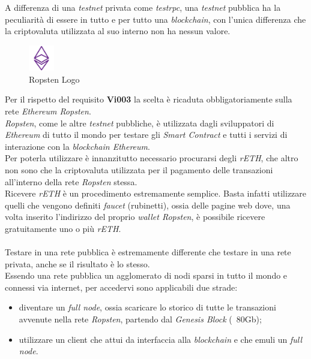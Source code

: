 \documentclass[11pt]{thesistemp}
\begin{document}
A differenza di una \textit{testnet} privata come \textit{testrpc}, una \textit{testnet} pubblica ha la peculiarità di essere in tutto e per tutto una \textit{blockchain}, con l'unica differenza che la criptovaluta utilizzata al suo interno non ha nessun valore.\\
\begin{figure}
	\vspace{-31pt}
	\begin{center}
    	\includegraphics[width=0.1\textwidth]{ropsten-logo.png}
  	\end{center}
  	\vspace{-10pt}
  	\caption{Ropsten Logo}
  	\label{fig:ropsten-logo}
\end{figure}
Per il rispetto del requisito \textbf{Vi003} la scelta è ricaduta obbligatoriamente sulla rete \textit{Ethereum Ropsten}.\\
\textit{Ropsten}, come le altre \textit{testnet} pubbliche, è utilizzata dagli sviluppatori di \textit{Ethereum} di tutto il mondo per testare gli \textit{Smart Contract} e tutti i servizi di interazione con la \textit{blockchain Ethereum}.\\
Per poterla utilizzare è innanzitutto necessario procurarsi degli \textit{rETH}, che altro non sono che la criptovaluta utilizzata per il pagamento delle transazioni all'interno della rete \textit{Ropsten} stessa.\\
Ricevere \textit{rETH} è un procedimento estremamente semplice.
Basta infatti utilizzare quelli che vengono definiti \textit{faucet} (rubinetti), ossia delle pagine web dove, una volta inserito l'indirizzo del proprio \textit{wallet Ropsten}, è possibile ricevere gratuitamente uno o più \textit{rETH}.\\\\
Testare in una rete pubblica è estremamente differente che testare in una rete privata, anche se il risultato è lo stesso.\\
Essendo una rete pubblica un agglomerato di nodi sparsi in tutto il mondo e connessi via internet, per accedervi sono applicabili due strade:
\begin{itemize}
	\item diventare un \textit{full node}, ossia scaricare lo storico di tutte le transazioni avvenute nella rete \textit{Ropsten}, partendo dal \textit{Genesis Block} (~80Gb);
	\item utilizzare un client che attui da interfaccia alla \textit{blockchain} e che emuli un \textit{full node}.
\end{itemize}
\end{document}
